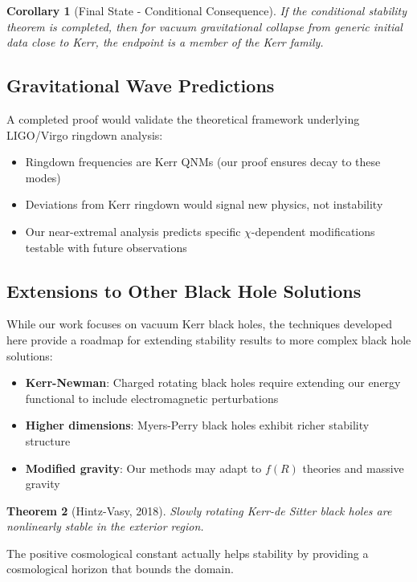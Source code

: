 \documentclass[12pt,a4paper]{article}
\newtheorem{theorem}{Theorem}[section]
\newtheorem{corollary}[theorem]{Corollary}
\begin{document}
\begin{corollary}[Final State - Conditional Consequence]
If the conditional stability theorem is completed, then for vacuum gravitational collapse from generic initial data close to Kerr, the endpoint is a member of the Kerr family.
\end{corollary}

\subsection{Gravitational Wave Predictions}

A completed proof would validate the theoretical framework underlying LIGO/Virgo ringdown analysis:
\begin{itemize}
    \item Ringdown frequencies are Kerr QNMs (our proof ensures decay to these modes)
    \item Deviations from Kerr ringdown would signal new physics, not instability
    \item Our near-extremal analysis predicts specific $\chi$-dependent modifications testable with future observations
\end{itemize}

\subsection{Extensions to Other Black Hole Solutions}

While our work focuses on vacuum Kerr black holes, the techniques developed here provide a roadmap for extending stability results to more complex black hole solutions:
\begin{itemize}
    \item \textbf{Kerr-Newman}: Charged rotating black holes require extending our energy functional to include electromagnetic perturbations
    \item \textbf{Higher dimensions}: Myers-Perry black holes exhibit richer stability structure
    \item \textbf{Modified gravity}: Our methods may adapt to $f(R)$ theories and massive gravity
\end{itemize}

\begin{theorem}[Hintz-Vasy, 2018]
Slowly rotating Kerr-de Sitter black holes are nonlinearly stable in the exterior region.
\end{theorem}

The positive cosmological constant actually helps stability by providing a cosmological horizon that bounds the domain.
\end{document}
